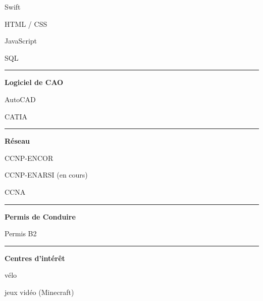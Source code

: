 \documentclass[a4paper]{letter}
\newcommand{\divider}{\rule{\linewidth}{0.9pt}}
\begin{document}
\begin{minipage}[t]{0.40\textwidth}
\faCircleNotch \quad Swift

\faCircleNotch \quad HTML / CSS

\faCircleNotch \quad JavaScript

\faCircleNotch \quad SQL

\divider


{\large \textbf{Logiciel de CAO}}

\faCircleNotch \quad AutoCAD

\faCircleNotch \quad CATIA

\divider



{\large \textbf{Réseau}}

\faNetworkWired \quad CCNP-ENCOR

\faNetworkWired \quad CCNP-ENARSI (en cours)

\faNetworkWired \quad CCNA


\divider

{\large \textbf{Permis de Conduire}}

\faCar \quad Permis B2

\divider

{\large \textbf{Centres d'intérêt}}

\faBicycle \quad vélo

\faGamepad \quad jeux vidéo (Minecraft)


\end{minipage}
\hfill
\end{document}
